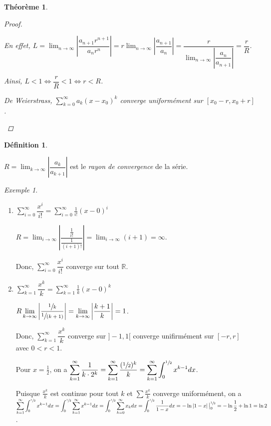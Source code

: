\documentclass{report}
\newcommand*{\dsum}[4]{\displaystyle\sum_{#1=#2}^{#3}#4}
\newcommand*{\dlim}[3]{\displaystyle\lim_{#1 \to #2}#3}
\newcommand*{\dint}[3]{\displaystyle\int_{#1}^{#2}#3}
\newcommand*{\abs}[1]{\left| #1 \right|}
\newcommand*{\reels}{\mathbb{R}}
\newtheorem*{thm}{Th\'eor\`eme}
\theoremstyle{definition}
\newtheorem*{defin}{D\'efinition}
\theoremstyle{remark}
\newtheorem*{exem}{Exemple}
\begin{document}
\begin{thm}
\begin{proof}
\begin{enumerate}[label=\alph*)]
\begin{enumerate}[label=\roman*)]
					En effet, $L = \dlim{n}{\infty}{\abs{\dfrac{a_{n+1}r^{n+1}}{a_nr^n}}} = r \dlim{n}{\infty}{\abs{\dfrac{a_{n+1}}{a_n}}} = \dfrac{r}{\dlim{n}{\infty}{\abs{\dfrac{a_n}{a_{n+1}}}}} = \dfrac{r}{R}$.

					Ainsi, $L<1 \Leftrightarrow \dfrac{r}{R}<1 \Leftrightarrow r<R$.
				\end{enumerate}

				De Weierstrass, $\dsum{k}{0}{\infty}{a_k(x-x_0)^k}$ converge uniform\'ement sur $[x_0-r, x_0+r]$.
			\end{enumerate}
		\end{proof}
	\end{thm}
	\begin{defin}~

		$R=\dlim{k}{\infty}{\abs{\dfrac{a_k}{a_{k+1}}}}$ est le \emph{rayon de convergence} de la s\'erie.
	\end{defin}
	\begin{exem}~

		\begin{enumerate}[label=\alph*)]
			\item $\dsum{i}{0}{\infty}{\dfrac{x^i}{i!}} = \dsum{i}{0}{\infty}{\frac{1}{i!}(x-0)^i}$

			$R = \dlim{i}{\infty}{\abs{\dfrac{\frac{1}{i!}}{\frac{1}{(i+1)!}}}} = \dlim{i}{\infty}{(i+1)} = \infty$.

			Donc, $\dsum{i}{0}{\infty}{\dfrac{x^i}{i!}}$ converge sur tout $\reels$.
			\item $\dsum{k}{1}{\infty}{\dfrac{x^k}{k}} = \dsum{k}{1}{\infty}{\frac{1}{k}(x-0)^k}$

			$R \dlim{k}{\infty}{\abs{\dfrac{\sfrac{1}{k}}{\sfrac{1}{(k+1)}}}} = \dlim{k}{\infty}{\abs{\dfrac{k+1}{k}}} = 1$.

			Donc, $\dsum{k}{1}{\infty}{\dfrac{x^k}{k}}$ converge sur $]-1,1[$ converge unifirm\'ement sur $[-r,r]$ avec $0<r<1$.

			Pour $x=\frac{1}{2}$, on a $\dsum{k}{1}{\infty}{\dfrac{1}{k \cdot 2^k}} = \dsum{k}{1}{\infty}{\dfrac{(\sfrac{1}{2})^k}}{k} = \dsum{k}{1}{\infty}{\dint{0}{\sfrac{1}{2}}{x^{k-1}dx}}$.

			Puisque $\frac{x^k}{k}$ est continue pour tout $k$ et $\sum\frac{x^k}{k}$ converge uniform\'ement, on a $\dsum{k}{1}{\infty}{\dint{0}{\sfrac{1}{2}}{x^{k-1}dx}} = \dint{0}{\sfrac{1}{2}}{\dsum{k}{1}{\infty}{x^{k-1}}dx} = \dint{0}{\sfrac{1}{2}}{\dsum{k}{0}{\infty}{x_k}dx} = \dint{0}{\sfrac{1}{2}}{\dfrac{1}{1-x}dx} = -\ln\abs{1-x}\big|_0^{\sfrac{1}{2}} = -\ln\frac{1}{2} + \ln1 = \ln2$.
		\end{enumerate}
	\end{exem}
\end{document}
